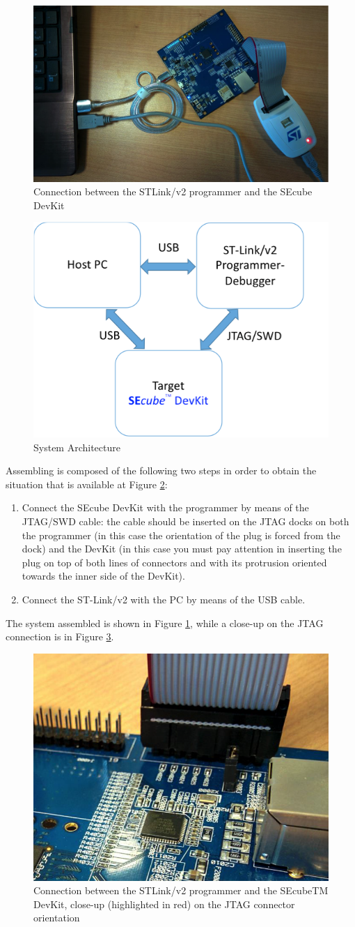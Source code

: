 \begin{figure}[H]
	\centering
	\includegraphics[width=0.42\linewidth]{images/firmware/setup_2}
	\caption{Connection between the STLink/v2 programmer and the SEcube DevKit}
	\label{fig:setup2}
\end{figure}

\begin{figure}
	\centering
	\includegraphics[width=0.35\linewidth]{images/firmware/setup_4}
	\caption{System Architecture}
	\label{fig:setup4}
\end{figure}


Assembling is composed of the following two steps in order to obtain the situation that is available at Figure \ref{fig:setup4}:
\begin{enumerate}
	\item Connect the SEcube DevKit with the programmer by means of the JTAG/SWD cable: the
	      cable should be inserted on the JTAG docks on both the programmer (in this case the orientation of the plug is forced from the dock) and the DevKit (in this case you must pay
	      attention in inserting the plug on top of both lines of connectors and with its protrusion
	      oriented towards the inner side of the DevKit).
	\item Connect the ST-Link/v2 with the PC by means of the USB cable.
\end{enumerate}
The system assembled is shown in Figure \ref{fig:setup2}, while a close-up on the JTAG connection is in Figure \ref{fig:setup3}.

\begin{figure}
	\centering
	\includegraphics[width=0.35\linewidth]{images/firmware/setup_3}
	\caption{Connection between the STLink/v2 programmer and the SEcubeTM DevKit, close-up (highlighted in red) on the JTAG connector orientation}
	\label{fig:setup3}
\end{figure}


